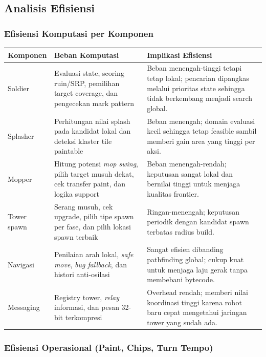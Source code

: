 \subsection{Analisis Efisiensi}

\subsubsection{Efisiensi Komputasi per Komponen}
\begin{longtable}{>{\raggedright\arraybackslash}p{} >{\raggedright\arraybackslash}p{} >{\raggedright\arraybackslash}p{}}
    \toprule
    \textbf{Komponen} & \textbf{Beban Komputasi} & \textbf{Implikasi Efisiensi} \\
    \midrule
    \endhead
    Soldier & Evaluasi state, scoring ruin/SRP, pemilihan target coverage, dan pengecekan mark pattern & Beban menengah-tinggi tetapi tetap lokal; pencarian dipangkas melalui prioritas state sehingga tidak berkembang menjadi search global. \\
    Splasher & Perhitungan nilai splash pada kandidat lokal dan deteksi klaster tile paintable & Beban menengah; domain evaluasi kecil sehingga tetap feasible sambil memberi gain area yang tinggi per aksi. \\
    Mopper & Hitung potensi \textit{mop swing}, pilih target musuh dekat, cek transfer paint, dan logika support & Beban menengah-rendah; keputusan sangat lokal dan bernilai tinggi untuk menjaga kualitas frontier. \\
    Tower spawn & Serang musuh, cek upgrade, pilih tipe spawn per fase, dan pilih lokasi spawn terbaik & Ringan-menengah; keputusan periodik dengan kandidat spawn terbatas radius build. \\
    Navigasi & Penilaian arah lokal, \textit{safe move}, \textit{bug fallback}, dan histori anti-osilasi & Sangat efisien dibanding pathfinding global; cukup kuat untuk menjaga laju gerak tanpa membebani bytecode. \\
    Messaging & Registry tower, \textit{relay} informasi, dan pesan 32-bit terkompresi & Overhead rendah; memberi nilai koordinasi tinggi karena robot baru cepat mengetahui jaringan tower yang sudah ada. \\
    \bottomrule
\end{longtable}

\subsubsection{Efisiensi Operasional (Paint, Chips, Turn Tempo)}

